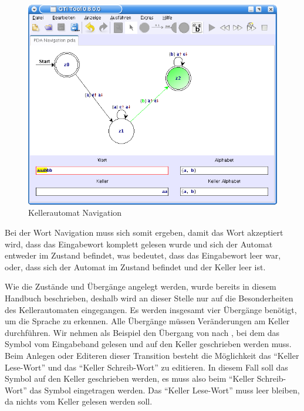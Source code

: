 \begin{figure}[h]
\begin{center}
\includegraphics[width=12cm]{images/pda_navigation.png}
\caption{Kellerautomat Navigation}
\end{center}
\end{figure}

Bei der Wort Navigation muss sich somit ergeben, damit das Wort akzeptiert wird,
dass das Eingabewort komplett gelesen wurde und sich der Automat entweder im
Zustand  befindet, was bedeutet, dass das Eingabewort leer war, oder,
dass sich der Automat im Zustand  befindet und der Keller leer
ist.\vspace{10pt}

Wie die Zustände und Übergänge angelegt werden, wurde bereits in diesem Handbuch
beschrieben, deshalb wird an dieser Stelle nur auf die Besonderheiten des
Kellerautomaten eingegangen. Es werden insgesamt vier Übergänge benötigt, um die
Sprache zu erkennen. Alle Übergänge müssen Veränderungen am Keller durchführen.
Wir nehmen als Beispiel den Übergang von  nach , bei dem das
Symbol  vom Eingabeband gelesen und auf den Keller geschrieben werden
muss. Beim Anlegen oder Editeren dieser Transition besteht die Möglichkeit das
"`Keller Lese-Wort"' und das "`Keller Schreib-Wort"' zu editieren. In diesem Fall
soll das Symbol  auf den Keller geschrieben werden, es muss also beim
"`Keller Schreib-Wort"' das Symbol  eingetragen werden. Das "`Keller
Lese-Wort"' muss leer bleiben, da nichts vom Keller gelesen werden
soll.\vspace{10pt}



